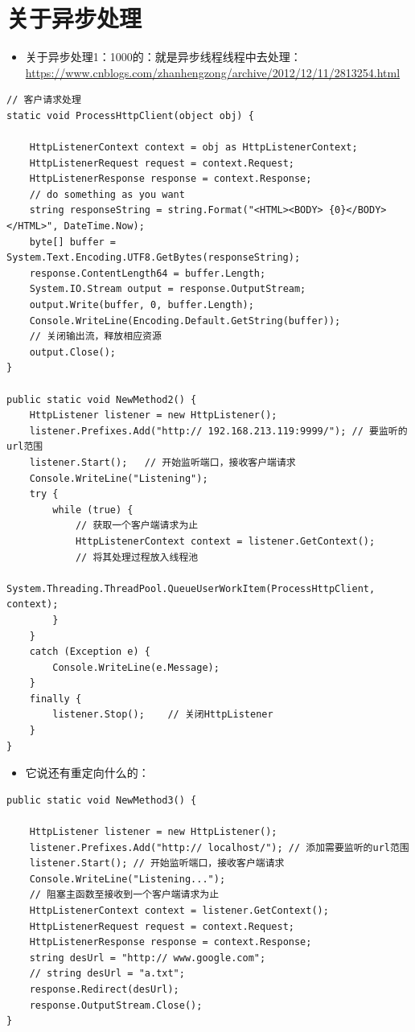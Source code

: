 \documentclass[9pt, b5paper]{article}
\begin{document}
\section{关于异步处理}
\label{sec-6}
\begin{itemize}
\item 关于异步处理1：1000的：就是异步线程线程中去处理：\url{https://www.cnblogs.com/zhanhengzong/archive/2012/12/11/2813254.html}
\end{itemize}
\begin{verbatim}
// 客户请求处理
static void ProcessHttpClient(object obj) {

    HttpListenerContext context = obj as HttpListenerContext;
    HttpListenerRequest request = context.Request;
    HttpListenerResponse response = context.Response;
    // do something as you want
    string responseString = string.Format("<HTML><BODY> {0}</BODY></HTML>", DateTime.Now);
    byte[] buffer = System.Text.Encoding.UTF8.GetBytes(responseString);
    response.ContentLength64 = buffer.Length;
    System.IO.Stream output = response.OutputStream;
    output.Write(buffer, 0, buffer.Length);
    Console.WriteLine(Encoding.Default.GetString(buffer));
    // 关闭输出流，释放相应资源
    output.Close();
}

public static void NewMethod2() {
    HttpListener listener = new HttpListener();
    listener.Prefixes.Add("http:// 192.168.213.119:9999/"); // 要监听的url范围
    listener.Start();   // 开始监听端口，接收客户端请求
    Console.WriteLine("Listening");
    try {
        while (true) {
            // 获取一个客户端请求为止
            HttpListenerContext context = listener.GetContext();
            // 将其处理过程放入线程池
            System.Threading.ThreadPool.QueueUserWorkItem(ProcessHttpClient, context);
        }
    }
    catch (Exception e) {
        Console.WriteLine(e.Message);
    }
    finally {
        listener.Stop();    // 关闭HttpListener
    }
}
\end{verbatim}
\begin{itemize}
\item 它说还有重定向什么的：
\end{itemize}
\begin{verbatim}
public static void NewMethod3() {

    HttpListener listener = new HttpListener();
    listener.Prefixes.Add("http:// localhost/"); // 添加需要监听的url范围
    listener.Start(); // 开始监听端口，接收客户端请求
    Console.WriteLine("Listening...");
    // 阻塞主函数至接收到一个客户端请求为止
    HttpListenerContext context = listener.GetContext();
    HttpListenerRequest request = context.Request;
    HttpListenerResponse response = context.Response;
    string desUrl = "http:// www.google.com";
    // string desUrl = "a.txt";
    response.Redirect(desUrl);
    response.OutputStream.Close();
}
\end{verbatim}
\end{document}

